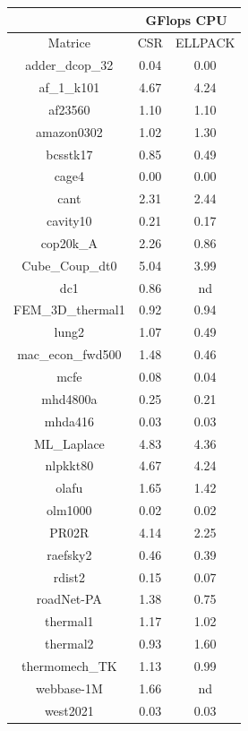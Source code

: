 \documentclass[12pt,halfline,a4paper]{ouparticle}
\begin{document}
\begin{center}
\begin{tabular}{|| c | c | c ||} 
\hline
 & \multicolumn{2}{c||}{GFlops CPU}\\
\hline
Matrice&CSR&ELLPACK\\
\hline
adder\_dcop\_32 & 0.04 & 0.00 \\
\hline
af\_1\_k101 & 4.67 & 4.24 \\
\hline
af23560 & 1.10 & 1.10 \\
\hline
amazon0302 & 1.02 & 1.30 \\
\hline
bcsstk17 & 0.85 & 0.49 \\
\hline
cage4 & 0.00 & 0.00 \\
\hline
cant & 2.31 & 2.44 \\
\hline
cavity10 & 0.21 & 0.17 \\
\hline
cop20k\_A & 2.26 & 0.86 \\
\hline
Cube\_Coup\_dt0 & 5.04 & 3.99 \\
\hline
dc1 & 0.86 & nd \\
\hline
FEM\_3D\_thermal1 & 0.92 & 0.94 \\
\hline
lung2 & 1.07 & 0.49 \\
\hline
mac\_econ\_fwd500 & 1.48 & 0.46 \\
\hline
mcfe & 0.08 & 0.04 \\
\hline
mhd4800a & 0.25 & 0.21 \\
\hline
mhda416 & 0.03 & 0.03 \\
\hline
ML\_Laplace & 4.83 & 4.36 \\
\hline
nlpkkt80 & 4.67 & 4.24 \\
\hline
olafu & 1.65 & 1.42 \\
\hline
olm1000 & 0.02 & 0.02 \\
\hline
PR02R & 4.14 & 2.25 \\
\hline
raefsky2 & 0.46 & 0.39 \\
\hline
rdist2 & 0.15 & 0.07 \\
\hline
roadNet-PA & 1.38 & 0.75 \\
\hline
thermal1 & 1.17 & 1.02 \\
\hline
thermal2 & 0.93 & 1.60 \\
\hline
thermomech\_TK & 1.13 & 0.99 \\
\hline
webbase-1M & 1.66 & nd \\
\hline
west2021 & 0.03 & 0.03 \\
\hline
\end{tabular}
\end{center}
\end{document}
